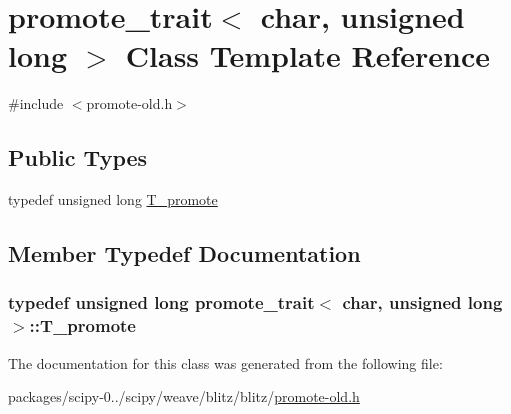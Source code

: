 \hypertarget{classpromote__trait_3_01char_00_01unsigned_01long_01_4}{}\section{promote\+\_\+trait$<$ char, unsigned long $>$ Class Template Reference}
\label{classpromote__trait_3_01char_00_01unsigned_01long_01_4}


{\ttfamily \#include $<$promote-\/old.\+h$>$}

\subsection*{Public Types}
\begin{DoxyCompactItemize}
\item 
typedef unsigned long \hyperlink{classpromote__trait_3_01char_00_01unsigned_01long_01_4_ad2d6a35a673f6485802463aa98eb3edc}{T\+\_\+promote}
\end{DoxyCompactItemize}


\subsection{Member Typedef Documentation}
\hypertarget{classpromote__trait_3_01char_00_01unsigned_01long_01_4_ad2d6a35a673f6485802463aa98eb3edc}{}
\subsubsection[{T\+\_\+promote}]{\setlength{\rightskip}{0pt plus 5cm}typedef unsigned long {\bf promote\+\_\+trait}$<$ char, unsigned long $>$\+::{\bf T\+\_\+promote}}\label{classpromote__trait_3_01char_00_01unsigned_01long_01_4_ad2d6a35a673f6485802463aa98eb3edc}


The documentation for this class was generated from the following file\+:\begin{DoxyCompactItemize}
\item 
packages/scipy-\/0../scipy/weave/blitz/blitz/\hyperlink{promote-old_8h}{promote-\/old.\+h}\end{DoxyCompactItemize}
